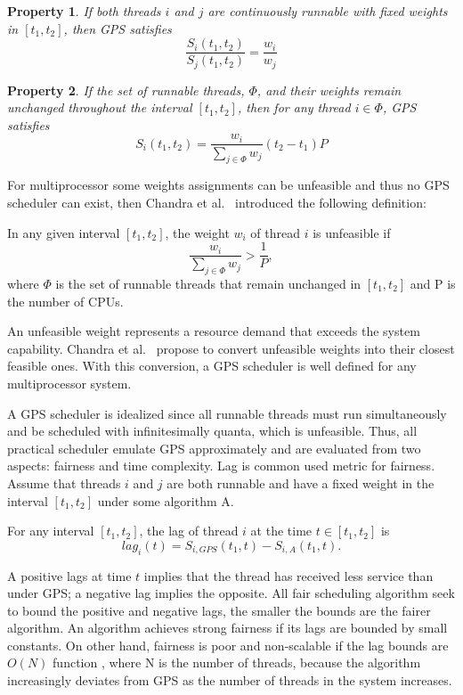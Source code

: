 \documentclass[11pt]{article}
\begin{document}
\newtheorem{gps-props}{Property}
\begin{gps-props}
If both threads $i$ and $j$ are continuously runnable with fixed weights in $[t_1, t_2]$, then GPS satisfies 
$$\frac{S_i(t_1, t_2)}{S_j(t_1, t_2)} = \frac{w_i}{w_j}$$
\end{gps-props}

\begin{gps-props}
If the set of runnable threads, $\Phi$, and their weights remain unchanged throughout  the interval $[t_1, t_2]$, then for any thread $i \in \Phi$, GPS satisfies
$$S_i(t_1, t_2) = \frac{w_i}{\sum_{j \in \Phi} w_j}(t_2 - t_1)P$$
\end{gps-props}

For multiprocessor some weights assignments can be unfeasible  and thus no GPS scheduler can exist, then Chandra et al.~\cite{chandra00} introduced the following definition:

\begin{gps-model}
In any given interval $[t_1, t_2]$, the weight $w_i$ of thread $i$ is unfeasible if
$$\frac{w_i}{\sum_{j \in \Phi}w_j} > \frac{1}{P},$$
where $\Phi$ is the set of runnable threads that remain unchanged in $[t_1, t_2]$ and P is the number of CPUs.
\end{gps-model} 

An unfeasible weight represents a resource demand that exceeds the system capability. Chandra et al.~\cite{chandra00} propose to convert unfeasible weights into their closest feasible ones. With this conversion, a GPS scheduler is well defined for any multiprocessor system.

A GPS scheduler is idealized since all runnable threads must run simultaneously and be scheduled with infinitesimally quanta, which is unfeasible. Thus, all practical scheduler emulate GPS approximately and are evaluated from two aspects: fairness and time complexity. Lag is common used metric for fairness. Assume that threads $i$ and $j$ are both runnable and have a fixed weight in the interval $[t_1, t_2]$ under some algorithm A.

\begin{gps-model}
For any interval $[t_1, t_2]$, the lag of thread $i$ at the time $t \in [t_1, t_2]$ is
$$lag_i(t) = S_{i, GPS}(t_1, t) - S_{i, A}(t_1, t).$$
\end{gps-model}

A positive lags at time $t$ implies that the thread has received less service than under GPS; a negative lag implies the opposite. All fair scheduling algorithm seek to bound the positive and negative lags, the smaller the bounds are the fairer algorithm. An algorithm achieves strong fairness if its lags are bounded by small constants. On other hand, fairness is poor and non-scalable if the lag bounds are $O(N)$ function , where N is the number of threads, because the algorithm  increasingly deviates from GPS as the number of threads in the system increases.
\end{document}
